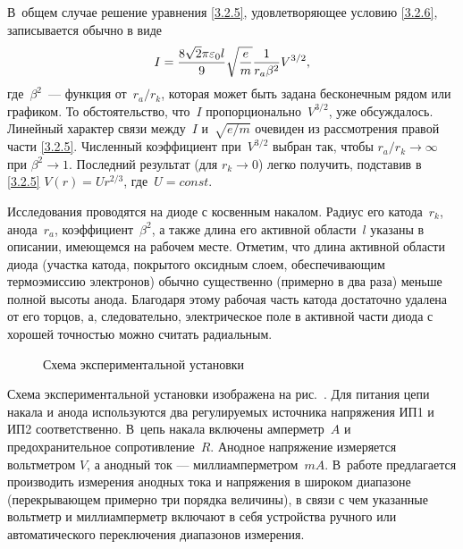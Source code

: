 В~общем случае решение уравнения \eqref{3.2.5}, удовлетворяющее условию
\eqref{3.2.6}, записывается обычно в виде
\begin{equation}
I=\frac{8\sqrt{2}\pi\varepsilon_0l}{9}
\sqrt{\frac{e}{m}}\frac{1}{r_a\beta^2}V^{3/2},
	\eqmark{3.2.8}
\end{equation}
где~$\beta^2$~--- функция от~$r_a/r_k$, которая может быть задана бесконечным
рядом или графиком. То обстоятельство, что~$I$ пропорционально~$V^{3/2}$, уже
обсуждалось. Линейный характер связи между~$I$ и~$\sqrt{e/m}$ очевиден из
рассмотрения правой части \eqref{3.2.5}. Численный коэффициент при~$V^{3/2}$
выбран так, чтобы $r_a/r_k\rightarrow\infty$ при $\beta^2\rightarrow 1$.
Последний результат (для $r_k\rightarrow 0$) легко получить, подставив в
\eqref{3.2.5} $V(r)=Ur^{2/3} $, где~$U=const$.

\experiment Исследования проводятся на диоде с косвенным накалом. Радиус его
катода~$r_k$, анода~$r_a$,  коэффициент~$\beta^2$, а также длина его активной
области~$l$  указаны в описании, имеющемся на рабочем месте. Отметим, что длина
активной области диода (участка катода, покрытого оксидным слоем, обеспечивающим
термоэмиссию электронов) обычно существенно (примерно в два раза) меньше полной
высоты анода. Благодаря этому рабочая часть катода достаточно удалена от его
торцов, а, следовательно,  электрическое поле в активной части диода с хорошей
точностью можно считать радиальным.
\begin{figure}[h!]
	\caption{Схема экспериментальной установки}
\end{figure}

Схема экспериментальной установки изображена на рис.~. Для
питания цепи накала и анода используются два регулируемых источника напряжения
ИП1 и ИП2 соответственно. В~цепь накала включены амперметр~$A$ и
предохранительное сопротивление~$R$. Анодное напряжение измеряется вольтметром
$V$, а анодный ток --- миллиамперметром~$mA$. В~работе предлагается производить
измерения анодных тока и напряжения в широком диапазоне (перекрывающем примерно
три порядка величины), в связи с чем указанные вольтметр и миллиамперметр
включают в себя устройства ручного или автоматического переключения диапазонов
измерения.

